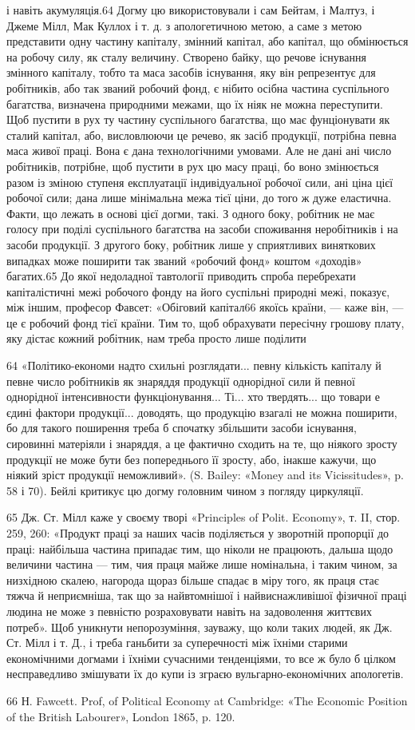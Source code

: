 і навіть акумуляція.64 Догму цю використовували і сам Бейтам,
і Малтуз, і Джеме Мілл, Мак Куллох і т. д. з апологетичною
метою, а саме з метою представити одну частину капіталу, змінний
капітал, або капітал, що обмінюється на робочу силу, як
сталу величину. Створено байку, що речове існування змінного
капіталу, тобто та маса засобів існування, яку він репрезентує
для робітників, або так званий робочий фонд, є нібито осібна
частина суспільного багатства, визначена природними межами,
що їх ніяк не можна переступити. Щоб пустити в рух ту частину
суспільного багатства, що має фунціонувати як сталий капітал,
або, висловлюючи це речево, як засіб продукції, потрібна
певна маса живої праці. Вона є дана технологічними умовами. Але
не дані ані число робітників, потрібне, щоб пустити в рух цю
масу праці, бо воно змінюється разом із зміною ступеня експлуатації
індивідуальної робочої сили, ані ціна цієї робочої сили;
дана лише мінімальна межа тієї ціни, до того ж дуже еластична.
Факти, що лежать в основі цієї догми, такі. З одного боку, робітник
не має голосу при поділі суспільного багатства на засоби
споживання неробітників і на засоби продукції. З другого
боку, робітник лише у сприятливих виняткових випадках може
поширити так званий «робочий фонд» коштом «доходів» багатих.65
До якої недоладної тавтології приводить спроба перебрехати
капіталістичні межі робочого фонду на його суспільні
природні межі, показує, між іншим, професор Фавсет: «Обіговий
капітал66 якоїсь країни, — каже він, — це є робочий фонд
тієї країни. Тим то, щоб обрахувати пересічну грошову плату,
яку дістає кожний робітник, нам треба просто лише поділити

64 «Політико-економи надто схильні розглядати... певну кількість
капіталу й певне число робітників як знаряддя продукції однорідної
сили й певної однорідної інтенсивности функціонування... Ті... хто твердять...
що товари е єдині фактори продукції... доводять, що продукцію
взагалі не можна поширити, бо для такого поширення треба б спочатку
збільшити засоби існування, сировинні матеріяли і знаряддя, а це фактично
сходить на те, що ніякого зросту продукції не може бути без попереднього
її зросту, або, інакше кажучи, що ніякий зріст продукції неможливий».
(S. Bailey: «Money and its Vicissitudes», p. 58 і 70). Бейлі
критикує цю догму головним чином з погляду циркуляції.

65    Дж. Ст. Мілл каже у своєму творі «Principles of Polit. Economy»,
т. II, стор. 259, 260: «Продукт праці за наших часів поділяється у зворотній
пропорції до праці: найбільша частина припадає тим, що ніколи
не працюють, дальша щодо величини частина — тим, чия праця майже
лише номінальна, і таким чином, за низхідною скалею, нагорода щораз
більше спадає в міру того, як праця стає тяжча й неприємніша, так що
за найвтомнішої і найвиснажливішої фізичної праці людина не може з
певністю розраховувати навіть на задоволення життєвих потреб». Щоб
уникнути непорозуміння, зауважу, що коли таких людей, як Дж. Ст.
Мілл і т. Д., і треба ганьбити за суперечності між їхніми старими економічними
догмами і їхніми сучасними тенденціями, то все ж було б цілком
несправедливо змішувати їх до купи із зграєю вульгарно-економічних
апологетів.

66 Н. Fawcett. Prof, of Political Economy at Cambridge: «The Economic
Position of the British Labourer», London 1865, p. 120.
